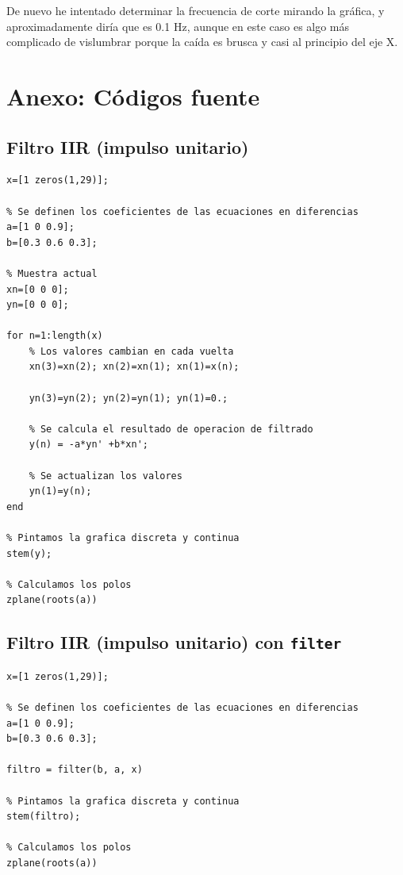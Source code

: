\documentclass[11pt,a4paper]{article}
\begin{document}
De nuevo he intentado determinar la frecuencia de corte mirando la gráfica, y aproximadamente diría que es 0.1 Hz, aunque en este caso es algo más complicado de vislumbrar porque la caída es brusca y casi al principio del eje X.

\newpage

\section{Anexo: Códigos fuente}

\subsection{Filtro IIR (impulso unitario)}
\label{code1}

\begin{lstlisting}[frame=single]
% Se define el array con los pulsos
x=[1 zeros(1,29)];

% Se definen los coeficientes de las ecuaciones en diferencias
a=[1 0 0.9];
b=[0.3 0.6 0.3];

% Muestra actual
xn=[0 0 0];
yn=[0 0 0];

for n=1:length(x)
	% Los valores cambian en cada vuelta
	xn(3)=xn(2); xn(2)=xn(1); xn(1)=x(n);

	yn(3)=yn(2); yn(2)=yn(1); yn(1)=0.;

	% Se calcula el resultado de operacion de filtrado
	y(n) = -a*yn' +b*xn';

	% Se actualizan los valores
	yn(1)=y(n);
end

% Pintamos la grafica discreta y continua
stem(y);

% Calculamos los polos
zplane(roots(a))
\end{lstlisting}

\subsection{Filtro IIR (impulso unitario) con \texttt{filter}}
\label{code2}

\begin{lstlisting}[frame=single]
% Se define el array con los pulsos
x=[1 zeros(1,29)];

% Se definen los coeficientes de las ecuaciones en diferencias
a=[1 0 0.9];
b=[0.3 0.6 0.3];

filtro = filter(b, a, x)

% Pintamos la grafica discreta y continua
stem(filtro);

% Calculamos los polos
zplane(roots(a))
\end{lstlisting}
\end{document}
